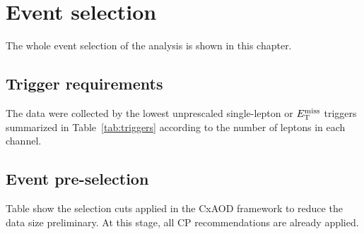 \chapter{Event selection}
The whole event selection of the analysis is shown in this chapter.

\section{Trigger requirements}

The data were collected by the lowest unprescaled single-lepton or $E_\mathrm{T}^\mathrm{miss}$ triggers summarized in Table~\ref{tab:triggers} according to the number of leptons in each channel.

\section{Event pre-selection}
Table show the selection cuts applied in the CxAOD framework to reduce the data size preliminary. At this stage, all CP recommendations are already applied.

